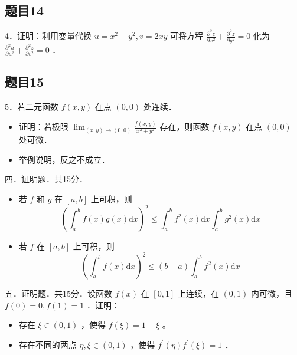 \documentclass{article}
\begin{document}
\subsection{题目14}
4．证明：利用变量代换 \(u=x^{2}-y^{2}, v=2 x y\) 可将方程 \(\frac{\partial^{2} z}{\partial x^{2}}+\frac{\partial^{2} z}{\partial y^{2}}=0\) 化为 \(\frac{\partial^{2} u}{\partial u^{2}}+\frac{\partial^{2} z}{\partial v^{2}}=0\) ．

\subsection{题目15}
5．若二元函数 \(f(x, y)\) 在点 \((0,0)\) 处连续．

\begin{itemize}
  \item[（1）] 证明：若极限 \(\lim _{(x, y) \rightarrow(0,0)} \frac{f(x, y)}{x^{2}+y^{2}}\) 存在，则函数 \(f(x, y)\) 在点 \((0,0)\) 处可微．
  \item[（2）] 举例说明，反之不成立．
\end{itemize}

四．证明题．共15分．

\begin{itemize}
  \item[（1）] 若 \(f\) 和 \(g\) 在 \([a, b]\) 上可积，则
\[
\left(\int_{a}^{b} f(x) g(x) \mathrm{d} x\right)^{2} \leq \int_{a}^{b} f^{2}(x) \mathrm{d} x \int_{a}^{b} g^{2}(x) \mathrm{d} x
\]
  \item[（2）] 若 \(f\) 在 \([a, b]\) 上可积，则
\[
\left(\int_{a}^{b} f(x) \mathrm{d} x\right)^{2} \leq(b-a) \int_{a}^{b} f^{2}(x) \mathrm{d} x
\]
\end{itemize}

五．证明题．共15分．设函数 \(f(x)\) 在 \([0,1]\) 上连续，在 \((0,1)\) 内可微，且 \(f(0)=0, f(1)=1\) ．证明：

\begin{itemize}
  \item[（1）] 存在 \(\xi \in(0,1)\) ，使得 \(f(\xi)=1-\xi\) 。
  \item[（2）] 存在不同的两点 \(\eta, \xi \in(0,1)\) ，使得 \(f^{\prime}(\eta) f^{\prime}(\xi)=1\) ．
\end{itemize}
\end{document}
